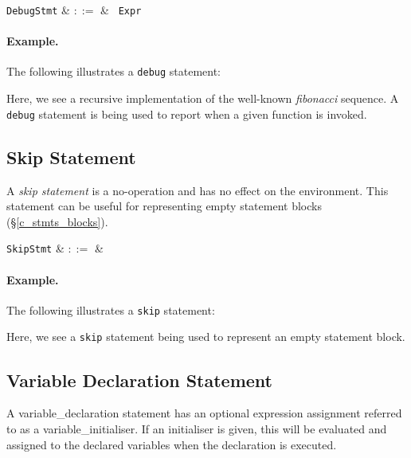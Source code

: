 \begin{syntax}
  \verb+DebugStmt+ & $::=$ & \ \verb+Expr+\\
\end{syntax}

\paragraph{Example.} The following illustrates a \lstinline{debug} statement:



Here, we see a recursive implementation of the well-known {\em fibonacci} sequence.  A \lstinline{debug} statement is being used to report when a given function is invoked.


\subsection{Skip Statement}
\label{c_stmts_skip}
A {\em skip statement} is a no-operation and has no effect on the environment.  This statement can be useful for representing empty statement blocks (\S\ref{c_stmts_blocks}).

\begin{syntax}
  \verb+SkipStmt+ & $::=$ & \\
\end{syntax}

\paragraph{Example.} The following illustrates a \lstinline{skip} statement:



Here, we see a \lstinline{skip} statement being used to represent an empty statement block.  


\subsection{Variable Declaration Statement}
\label{c_stmts_var_decl}
A \gls{variable_declaration} statement has an optional expression assignment referred to as a \gls{variable_initialiser}.  If an initialiser is given, this will be evaluated and assigned to the declared variables when the declaration is executed.  

